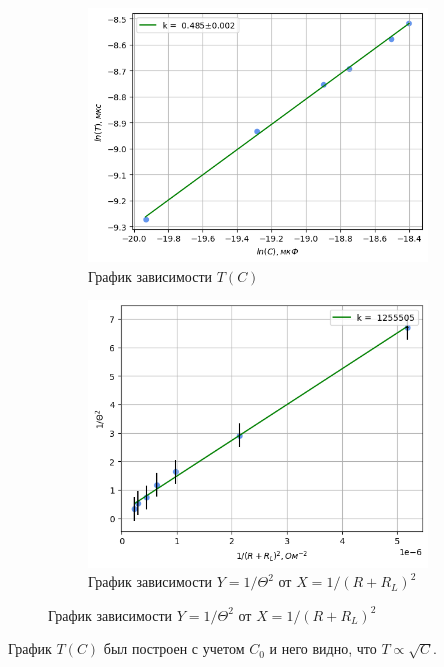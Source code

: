 \begin{figure}[h!]
\begin{subfigure}{0.45\linewidth}
    \centering
    \includegraphics[width=9cm]{images/plot1.png}
    \caption{График зависимости $T(C)$}
\end{subfigure}
\hfill
\begin{subfigure}{0.55\linewidth}
    \centering
    \includegraphics[width=9cm]{images/plot2.png}
\caption{График зависимости $Y = 1 / \Theta^2 \text{ от } X = 1 /  (R + R_L)^2$}
\end{subfigure}
\end{figure}
\indent График $T(C)$ был построен с учетом $C_0$ и него видно, что $T \propto \sqrt{C}$.

